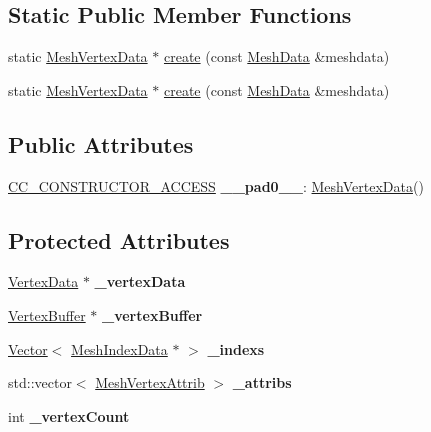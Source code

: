 \subsection*{Static Public Member Functions}
\begin{DoxyCompactItemize}
\item 
static \hyperlink{classMeshVertexData}{Mesh\+Vertex\+Data} $\ast$ \hyperlink{classMeshVertexData_a652f988804e74dd1af705ffc24147ea0}{create} (const \hyperlink{structMeshData}{Mesh\+Data} \&meshdata)
\item 
static \hyperlink{classMeshVertexData}{Mesh\+Vertex\+Data} $\ast$ \hyperlink{classMeshVertexData_a3dfbf234e551926d37c4ecdec346233a}{create} (const \hyperlink{structMeshData}{Mesh\+Data} \&meshdata)
\end{DoxyCompactItemize}
\subsection*{Public Attributes}
\begin{DoxyCompactItemize}
\item 
\mbox{\label{classMeshVertexData_af4e00dd6a1d2edfa8fa0fdaddb2b873c}} 
\hyperlink{_2cocos2d_2cocos_2base_2ccConfig_8h_a25ef1314f97c35a2ed3d029b0ead6da0}{C\+C\+\_\+\+C\+O\+N\+S\+T\+R\+U\+C\+T\+O\+R\+\_\+\+A\+C\+C\+E\+SS} {\bfseries \+\_\+\+\_\+pad0\+\_\+\+\_\+}\+: \hyperlink{classMeshVertexData}{Mesh\+Vertex\+Data}()
\end{DoxyCompactItemize}
\subsection*{Protected Attributes}
\begin{DoxyCompactItemize}
\item 
\mbox{\label{classMeshVertexData_a9912252e30b2cf8ed719c6132b34b360}} 
\hyperlink{classVertexData}{Vertex\+Data} $\ast$ {\bfseries \+\_\+vertex\+Data}
\item 
\mbox{\label{classMeshVertexData_a73afededcb68217e0d52793881c9dcf3}} 
\hyperlink{classVertexBuffer}{Vertex\+Buffer} $\ast$ {\bfseries \+\_\+vertex\+Buffer}
\item 
\mbox{\label{classMeshVertexData_a6db1ac9b22c0b73b494a3d1033937f26}} 
\hyperlink{classVector}{Vector}$<$ \hyperlink{classMeshIndexData}{Mesh\+Index\+Data} $\ast$ $>$ {\bfseries \+\_\+indexs}
\item 
\mbox{\label{classMeshVertexData_a086189ec29f809d5edacfcc57245dc9c}} 
std\+::vector$<$ \hyperlink{structMeshVertexAttrib}{Mesh\+Vertex\+Attrib} $>$ {\bfseries \+\_\+attribs}
\item 
\mbox{\label{classMeshVertexData_aedb8e389132cbb5b95689575457698a1}} 
int {\bfseries \+\_\+vertex\+Count}
\end{DoxyCompactItemize}
